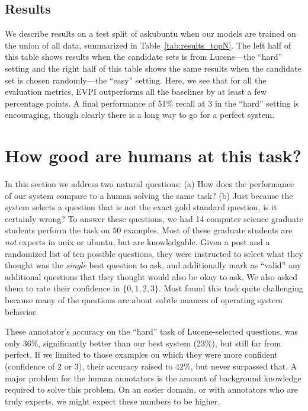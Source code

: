 \documentclass[11pt,a4paper]{article}
\begin{document}
\subsection{Results}

We describe results on a test split of askubuntu when our models are trained on the union of all data, summarized in Table~\ref{tab:results_topN}. The left half of this table shows results when the candidate sets is from Lucene---the ``hard'' setting and the right half of this table shows the same results when the candidate set is chosen randomly---the ``easy'' setting. Here, we see that for all the evaluation metrics, EVPI outperforms all the baselines by at least a few percentage points. A final performance of 51\% recall at 3 in the ``hard'' setting is encouraging, though clearly there is a long way to go for a perfect system. 

\section{How good are humans at this task?}

In this section we address two natural questions:
(a) How does the performance of our system compare to a human solving the same task?
(b) Just because the system selects a question that is not the exact gold standard question, is it certainly wrong?
To answer these questions, we had 14 computer science graduate students perform the task on $50$ examples.
Most of these graduate students are \emph{not} experts in unix or ubuntu, but are knowledgable.
Given a post and a randomized list of ten possible questions, they were instructed to select what they thought was the \emph{single} best question to ask, and additionally mark as ``valid'' any additional questions that they thought would also be okay to ask.
We also asked them to rate their confidence in $\{0,1,2,3\}$.
Most found this task quite challenging because many of the questions are about subtle nuances of operating system behavior.

These annotator's accuracy on the ``hard'' task of Lucene-selected questions, was only 36\%, significantly better than our best system (23\%), but still far from perfect.
If we limited to those examples on which they were more confident (confidence of 2 or 3), their accuracy raised to 42\%, but never surpassed that.
A major problem for the human annotators is the amount of background knowledge required to solve this problem.
On an easier domain, or with annotators who are truly experts, we might expect these numbers to be higher.
\end{document}
